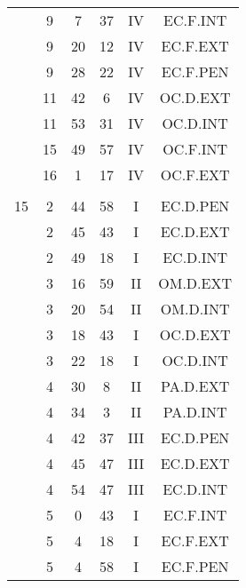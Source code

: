 \documentclass[12pt, a4paper]{article}
\begin{document}
\begin{multicols}{3}
{\begin{tabular}{c c c c c c}
	 	 	 	 & 9 & 7 & 37 & IV & EC.F.INT\\%
	 	 	 	 & 9 & 20 & 12 & IV & EC.F.EXT\\%
	 	 	 	 & 9 & 28 & 22 & IV & EC.F.PEN\\%
	 	 	 	 & 11 & 42 & 6 & IV & OC.D.EXT\\%
	 	 	 	 & 11 & 53 & 31 & IV & OC.D.INT\\%
	 	 	 	 & 15 & 49 & 57 & IV & OC.F.INT\\%
	 	 	 	 & 16 & 1 & 17 & IV & OC.F.EXT\\%
	 	 	 	 & & & & & \\%
	 	 	 	15 & 2 & 44 & 58 & I & EC.D.PEN\\%
	 	 	 	 & 2 & 45 & 43 & I & EC.D.EXT\\%
	 	 	 	 & 2 & 49 & 18 & I & EC.D.INT\\%
	 	 	 	 & 3 & 16 & 59 & II & OM.D.EXT\\%
	 	 	 	 & 3 & 20 & 54 & II & OM.D.INT\\%
	 	 	 	 & 3 & 18 & 43 & I & OC.D.EXT\\%
	 	 	 	 & 3 & 22 & 18 & I & OC.D.INT\\%
	 	 	 	 & 4 & 30 & 8 & II & PA.D.EXT\\%
	 	 	 	 & 4 & 34 & 3 & II & PA.D.INT\\%
	 	 	 	 & 4 & 42 & 37 & III & EC.D.PEN\\%
	 	 	 	 & 4 & 45 & 47 & III & EC.D.EXT\\%
	 	 	 	 & 4 & 54 & 47 & III & EC.D.INT\\%
	 	 	 	 & 5 & 0 & 43 & I & EC.F.INT\\%
	 	 	 	 & 5 & 4 & 18 & I & EC.F.EXT\\%
	 	 	 	 & 5 & 4 & 58 & I & EC.F.PEN\\%

\end{tabular}}
\end{multicols}
\end{document}
